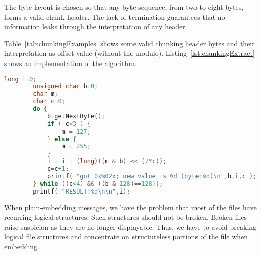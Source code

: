 The byte layout is chosen so that any byte sequence, from two to eight bytes, forms a valid chunk header. The lack of termination guarantees that no information leaks through the interpretation of any header.

Table~\ref{tab:chunkingExamples} shows some valid chunking header bytes and their interpretation as offset value (without the modulo). Listing~\ref{lst:chunkingExtract} shows an implementation of the algorithm.

\begin{lstfloat}[ht]
	\begin{lstlisting}[language=c]
		long i=0;
		unsigned char b=0;
		char m;
		char c=0;
		do {
			b=getNextByte();
			if ( c<3 ) {
				m = 127;
			} else {
				m = 255;
			}
			i = i | (long)((m & b) << (7*c));
			c=c+1;
			printf( "got 0x%02x; new value is %d (byte:%d)\n",b,i,c );
		} while ((c<4) && ((b & 128)==128));
		printf( "RESULT:%d\n\n",i);
	\end{lstlisting}
	\caption{Reference implementation for extraction of a chunking value in C.}
	\label{lst:chunkingExtract}
\end{lstfloat}


When plain-embedding messages, we have the problem that most of the files have recurring logical structures. Such structures should not be broken. Broken files raise suspicion as they are no longer displayable. Thus, we have to avoid breaking logical file structures and concentrate on structureless portions of the file when embedding. 

